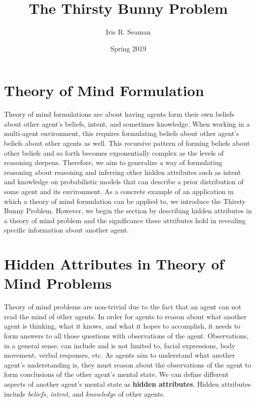 \documentclass[twocolumn]{article}
\title{The Thirsty Bunny Problem}
\author{Iris R. Seaman}
\date{Spring 2019}
\begin{document}
\maketitle

\section{Theory of Mind Formulation}
Theory of mind formulations are about having agents form their own beliefs about other agent's beliefs, intent, and sometimes knowledge. When working in a multi-agent environment, this requires formulating beliefs about other agent's beliefs about other agents as well. This recursive pattern of forming beliefs about other beliefs and so forth becomes exponentially complex as the levels of reasoning deepens. Therefore, we aim to generalize a way of formulating reasoning about reasoning and inferring other hidden attributes such as intent and knowledge on probabilistic models that can describe a prior distribution of some agent and its environment. As a concrete example of an application in which a theory of mind formulation can be applied to, we introduce the Thirsty Bunny Problem. However, we begin the section by describing hidden attributes in a theory of mind problem and the significance these attributes hold in revealing specific information about another agent. 

\section{Hidden Attributes in Theory of Mind Problems}

Theory of mind problems are non-trivial due to the fact that an agent can not read the mind of other agents. In order for agents to reason about what another agent is thinking, what it knows, and what it hopes to accomplish, it needs to form answers to all those questions with observations of the agent. Observations, in a general sense, can include and is not limited to, facial expressions, body movement, verbal responses, etc. 
As agents aim to understand what another agent's understanding is, they must reason about the observations of the agent to form conclusions of the other agent's mental state. We can define different aspects of another agent's mental state as \textbf{hidden attributes}. Hidden attributes include \textit{beliefs, intent,} and \textit{knowledge} of other agents.  
 
\end{document}
